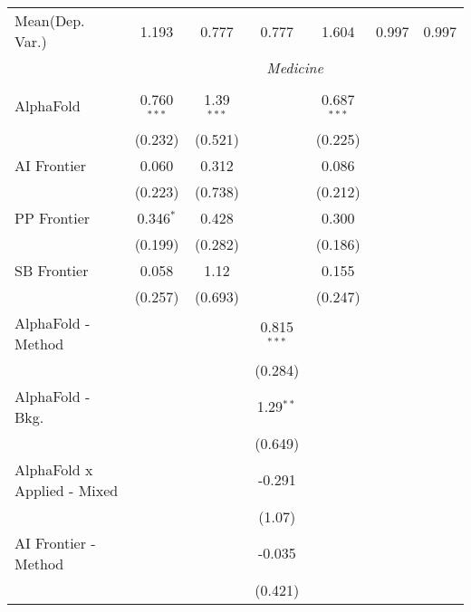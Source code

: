 \begin{tabular}{lcccccc}
Mean(Dep. Var.) & 1.193 & 0.777 & 0.777 & 1.604 & 0.997 & 0.997 \\
 & \multicolumn{6}{c}{\textit{Medicine}} \\ \\
   AlphaFold                     & 0.760$^{***}$ & 1.39$^{***}$ &               & 0.687$^{***}$ &        &   \\   
                                 & (0.232)       & (0.521)      &               & (0.225)       &        &   \\   
   AI Frontier                   & 0.060         & 0.312        &               & 0.086         &        &   \\   
                                 & (0.223)       & (0.738)      &               & (0.212)       &        &   \\   
   PP Frontier                   & 0.346$^{*}$   & 0.428        &               & 0.300         &        &   \\   
                                 & (0.199)       & (0.282)      &               & (0.186)       &        &   \\   
   SB Frontier                   & 0.058         & 1.12         &               & 0.155         &        &   \\   
                                 & (0.257)       & (0.693)      &               & (0.247)       &        &   \\   
   AlphaFold - Method            &               &              & 0.815$^{***}$ &               &        &   \\   
                                 &               &              & (0.284)       &               &        &   \\   
   AlphaFold - Bkg.              &               &              & 1.29$^{**}$   &               &        &   \\   
                                 &               &              & (0.649)       &               &        &   \\   
   AlphaFold x Applied - Mixed   &               &              & -0.291        &               &        &   \\   
                                 &               &              & (1.07)        &               &        &   \\   
   AI Frontier - Method          &               &              & -0.035        &               &        &   \\   
                                 &               &              & (0.421)       &               &        &   \\   

\end{tabular}
